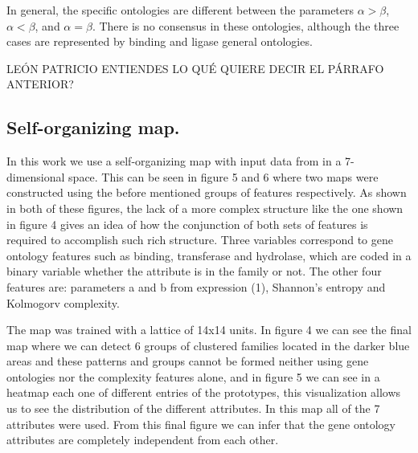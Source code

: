\documentclass[preprint,12pt]{elsarticle}
\begin{document}
In general, the specific ontologies are different between the 
parameters $\alpha > \beta$, $\alpha < \beta $, and $\alpha = \beta $. 
There is no consensus in these ontologies, although the three cases are 
represented by binding and ligase general ontologies. \par 

LEÓN PATRICIO ENTIENDES LO QUÉ QUIERE DECIR EL PÁRRAFO ANTERIOR? \par


\subsection{\textbf{Self-organizing map.}}

In this work we use a self-organizing map with input data 
from in a 7-dimensional space. This can be seen in figure 5 and 6 
where two maps were constructed using the before mentioned groups of 
features respectively.  As shown in both of these figures, the lack 
of a more complex structure like the one shown in figure 4 gives 
an idea of how the conjunction of both sets of features is required 
to accomplish such rich structure. Three variables correspond to gene 
ontology features such as binding, transferase and hydrolase, which 
are coded in a binary variable whether the attribute is in the family 
or not. The other four features are: parameters a and b from expression 
(1),  Shannon’s entropy and Kolmogorv complexity. \par 

The map was trained with a lattice of 14x14 units. In figure 4 we 
can see the final map where we can detect 6 groups of clustered families 
located in the darker blue areas and these patterns and groups cannot 
be formed neither using gene ontologies  nor the complexity features 
alone, and in figure 5 we can see in a heatmap each one of different 
entries of the prototypes, this visualization allows us to see the 
distribution of the different attributes. In this map all of the 7 
attributes were used. From this final figure we can infer that the 
gene ontology attributes are completely independent from each other. 
\par 
\end{document}
